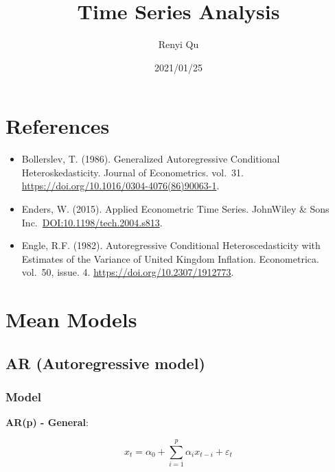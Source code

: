 \documentclass[
]{book}
\title{Time Series Analysis}
\author{Renyi Qu}
\date{2021/01/25}
\providecommand{\tightlist}{%
  \setlength{\itemsep}{0pt}\setlength{\parskip}{0pt}}
\begin{document}
\frontmatter
\maketitle

\mainmatter
\DeclareMathOperator*{\argmin}{argmin}
\DeclareMathOperator*{\argmax}{argmax}

\hypertarget{references}{%
\chapter*{References}\label{references}}

\begin{itemize}
\tightlist
\item
  Bollerslev, T. (1986). Generalized Autoregressive Conditional
  Heteroskedasticity. Journal of Econometrics. vol.~31.
  \url{https://doi.org/10.1016/0304-4076(86)90063-1}.
\item
  Enders, W. (2015). Applied Econometric Time Series. JohnWiley \& Sons
  Inc.~\href{https://www.tandfonline.com/doi/abs/10.1198/tech.2004.s813}{DOI:10.1198/tech.2004.s813}.
\item
  Engle, R.F. (1982). Autoregressive Conditional Heteroscedasticity with
  Estimates of the Variance of United Kingdom Inflation. Econometrica.
  vol.~50, issue. 4. \url{https://doi.org/10.2307/1912773}.
\end{itemize}

\hypertarget{m}{%
\chapter{Mean Models}\label{m}}

\hypertarget{ar-autoregressive-model}{%
\section{AR (Autoregressive model)}\label{ar-autoregressive-model}}

\hypertarget{model}{%
\subsection{Model}\label{model}}

\textbf{AR(p) - General}:

\[\begin{equation*} x_t=\alpha_0+\sum_{i=1}^{p}{\alpha_i x_{t-i}}+\varepsilon_t
\end{equation*}\]
\end{document}
